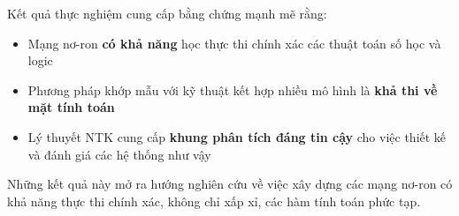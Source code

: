 \vspace{0.2cm}

Kết quả thực nghiệm cung cấp bằng chứng mạnh mẽ rằng:
\begin{itemize}
    \item Mạng nơ-ron \textbf{có khả năng} học thực thi chính xác các thuật toán số học và logic
    \item Phương pháp khớp mẫu với kỹ thuật kết hợp nhiều mô hình là \textbf{khả thi về mặt tính toán}
    \item Lý thuyết NTK cung cấp \textbf{khung phân tích đáng tin cậy} cho việc thiết kế và đánh giá các hệ thống như vậy
\end{itemize}

Những kết quả này mở ra hướng nghiên cứu về việc xây dựng các mạng nơ-ron có khả năng thực thi chính xác, không chỉ xấp xỉ, các hàm tính toán phức tạp.
